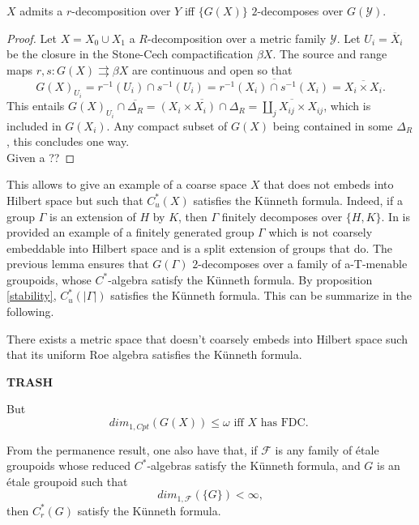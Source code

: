 \begin{lem}
$X$ admits a $r$-decomposition over $Y$ iff $\{G(X)\}$ $2$-decomposes over $G(\mathcal Y)$.
\end{lem}

\begin{proof}
Let $X= X_0\cup X_1$ a $R$-decomposition over a metric family $\mathcal Y$. Let $U_i = \overline X_i$ be the closure in the Stone-Cech compactification $\beta X$. The source and range maps $r,s : G(X) \rightrightarrows \beta X$ are continuous and open so that 
\[G(X)_{U_i} = r^{-1}(U_i)\cap s^{-1}(U_i) = \overline {r^{-1}(X_i)\cap s^{-1}(X_i)} = \overline {X_i \times X_i}.\]
This entails $G(X)_{U_i} \cap \overline {\Delta_R} = \overline {(X_i \times X_i )\cap \Delta_R } = \overline{\coprod_j X_{ij}\times X_{ij}}$, which is included in $G(X_i)$. Any compact subset of $G(X)$ being contained in some $\Delta_R$, this concludes one way.\\

Given a ??  
\end{proof}

This allows to give an example of a coarse space $X$ that does not embeds into Hilbert space but such that $C^*_u (X)$ satisfies the Künneth formula. Indeed, if a group $\Gamma$ is an extension of $H$ by $K$, then $\Gamma$ finitely decomposes over $\{H,K\}$. In \cite{ArzhantsevaTesssera} is provided an example of a finitely generated group $\Gamma$ which is not coarsely embeddable into Hilbert space and is a split extension of groups that do. The previous lemma ensures that $G(\Gamma)$ $2$-decomposes over a family of a-T-menable groupoids, whose $C^*$-algebra satisfy the Künneth formula. By proposition \ref{stability}, $C^*_u(|\Gamma|)$ satisfies the Künneth formula. This can be summarize in the following.

\begin{prop}
There exists a metric space that doesn't coarsely embeds into Hilbert space such that its uniform Roe algebra satisfies the Künneth formula.
\end{prop}   


\textbf{TRASH}

But \[dim_{1,Cpt}(G(X))\leq \omega \text{ iff } X \text{ has FDC. } \]

From the permanence result, one also have that, if $\mathcal F$ is any family of \'etale groupoids whose reduced $C^*$-algebras satisfy the Künneth formula, and $G$ is an \'etale groupoid such that \[dim_{1, \mathcal F} ( \{G\} ) < \infty, \]
then $C_r^*(G)$ satisfy the Künneth formula.\\

